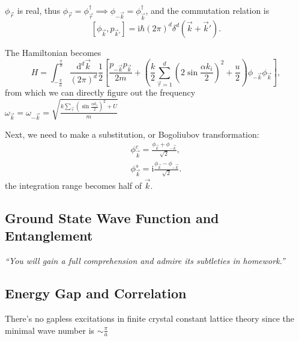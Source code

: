 $\phi_{\vec{r}}$ is real, thus $\phi_{\vec{r}} = \phi_{\vec{r}}^\dagger \implies \phi_{-\vec{k}} = \phi_{\vec{k}}^\dagger$, and the commutation relation is
\begin{equation}
  \left[ \phi_{\vec{k}}, p_{\vec{k}'} \right] = \mathrm{i} \hbar (2\pi)^d \delta^{d}(\vec{k} + \vec{k}').
\end{equation}

The Hamiltonian becomes
\begin{equation}
  H = \int_{-\frac{\pi}{\alpha}}^{\frac{\pi}{\alpha}} \frac{\mathrm{d} ^d \vec{k}}{(2\pi)^d}\frac{1}{2}
  \left[ 
    \frac{p_{-\vec{k}}p_{\vec{k}}}{2m} + \left( \frac{k}{2} \sum_{\vec{\tau} = 1}^d \left( 2 \sin \frac{\alpha k_i}{2} \right) ^2 + \frac{u}{2}  \right) \phi_{-\vec{k}}\phi_{\vec{k}}
   \right] ,
\end{equation}
from which we can directly figure out the frequency $\omega_{\vec{k}} = \omega_{-\vec{k}} = \sqrt{\frac{k \sum_{\vec{\tau}} \left( \sin \frac{\alpha k_i}{2} \right) ^2 + U}{m}}$

Next, we need to make a substitution, or Bogoliubov transformation:
\begin{align}
  \phi_{\vec{k}}^c = \frac{\phi_{\vec{k}}+\phi_{-\vec{k}}}{\sqrt{2}},
  \\
  \phi_{\vec{k}}^s = \mathrm{i} \frac{\phi_{\vec{k}} - \phi_{-\vec{k}}}{\sqrt{2}}.
\end{align}
the integration range becomes half of $\vec{k}$.




\subsection{Ground State Wave Function and Entanglement}
\emph{``You will gain a full comprehension and admire its subtleties in homework.''}

\subsection{Energy Gap and Correlation}
There's no gapless excitations in finite crystal constant lattice theory since the minimal wave number is $\sim  \frac{\pi}{a}$